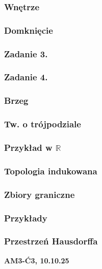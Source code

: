 \documentclass[10pt,a4paper]{article}
\newcommand{\zagadnienie}[3]{%
    \clearpage %
    \noindent\textbf{#1} #2\\
    #3
}
\begin{document}
{
    \begin{tcolorbox}[mybox]
    \subsubsection*{Wnętrze}
    \subsubsection*{Domknięcie}
    \end{tcolorbox}
    \subsubsection*{Zadanie 3.}
    \subsubsection*{Zadanie 4.}
    \begin{tcolorbox}[mybox]
    \subsubsection*{Brzeg}
    \subsubsection*{Tw. o trójpodziale}
    \subsubsection*{Przykład w $\mathbb{R}$}
    \subsubsection*{Topologia indukowana}
    \subsubsection*{Zbiory graniczne}
    \subsubsection*{Przykłady}
    \subsubsection*{Przestrzeń Hausdorffa}
    \end{tcolorbox}
}
\zagadnienie{AM3-Ć3, 10.10.25}{}
\end{document}
